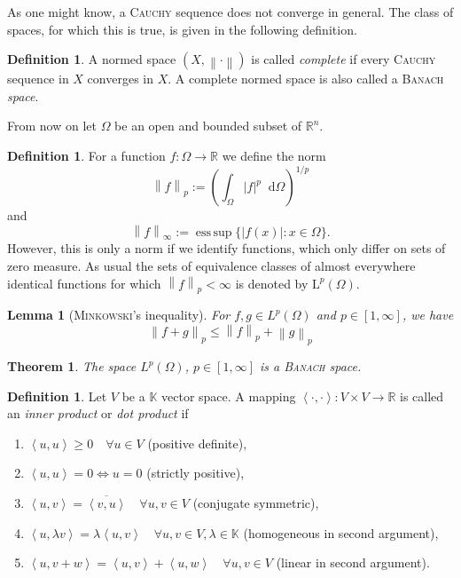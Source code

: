 \documentclass[12pt,a4paper,twoside, open=right]{scrreprt}
\theoremstyle{definition}
\newtheorem{defn}[auf]{Definition}
\theoremstyle{plain}
\newtheorem{sa}[auf]{Theorem}
\newtheorem{lem}[auf]{Lemma}
\DeclareMathOperator*{\esssup}{ess\,sup} %
\newcommand{\abs}[1]{\left\vert #1\right\vert}
\newcommand{\dotp}[2]{\left\langle #1,#2\right\rangle}
\newcommand{\rr}{\mathbb{R}}
\newcommand{\kk}{\mathbb{K}}
\newcommand{\norm}[1]{\left\lVert#1\right\rVert}
\newcommand{\D}{\mathop{}\!\mathrm{d}}
\begin{document}
As one might know, a \textsc{Cauchy} sequence does not converge in general. The class of spaces, for which this is true, is given in the following definition.
\begin{defn}
    A normed space $(X, \norm{\cdot})$ is called \emph{complete} if every \textsc{Cauchy} sequence in $X$ converges in $X$. A complete normed space is also called a \textsc{Banach} \emph{space}.
\end{defn}
From now on let $\Omega$ be an open and bounded subset of $\rr^n$.
\begin{defn}
    For a function $f\colon\Omega\to\rr$ we define the norm
     \begin{equation}
    \norm{f}_{p}:=\left(\int_\Omega\abs{f}^p\D\Omega\right)^{1/p}
    \end{equation}
    and
     \begin{equation}
    \norm{f}_{\infty}:=\esssup\{\abs{f(x)}\colon x\in\Omega\}.
    \end{equation}
    However, this is only a norm if we identify functions, which only differ on sets of zero measure. As usual the sets of equivalence classes of almost everywhere identical functions for which $\norm{f}_p<\infty$ is denoted by $\mathrm{L}^p(\Omega)$.
\end{defn}
\begin{lem}[\textsc{Minkowski}'s inequality]
    For $f,g\in L^p(\Omega)$ and $p\in[1,\infty]$, we have
    \begin{equation}
        \norm{f+g}_p\le\norm{f}_p+\norm{g}_p
    \end{equation}
\end{lem}
\begin{sa}
    The space $L^p(\Omega)$, $p\in[1,\infty]$ is a \textsc{Banach} space.
\end{sa}
\begin{defn}
    Let $V$ be a $\kk$ vector space. A mapping $\dotp{\cdot}{\cdot}\colon V\times V\to\rr$ is called an \emph{inner product} or \emph{dot product} if 
    \begin{enumerate}
        \item $\dotp{u}{u} \ge 0 \quad \forall u\in V$ (positive definite),
        \item $\dotp{u}{u} = 0 \Leftrightarrow u=0 $  (strictly positive),
        \item $\dotp{u}{v} = \overline{\dotp{v}{u}}   \quad\forall u,v\in V$ (conjugate symmetric),
        \item $\dotp{u}{\lambda v} = \lambda\dotp{u}{v} \quad\forall u,v\in V,\lambda\in\kk$ (homogeneous in second argument),
        \item $\dotp{u}{v+w} =\dotp{u}{v}+\dotp{u}{w} \quad\forall u,v\in V$ (linear in second argument).
    \end{enumerate}
\end{defn}
\end{document}
